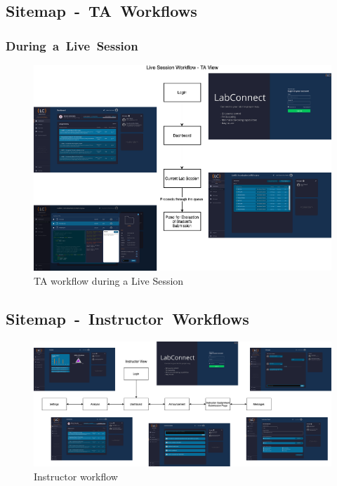 \documentclass[a4paper, 12pt]{article}
\begin{document}
    \pagebreak

    \subsection{Sitemap~-~TA~Workflows}

    \subsubsection{During~a~Live~Session}

    \begin{figure}[H]
      \centering
      \includegraphics[width=\textwidth]{map_live-session-ta}
      \caption{TA workflow during a Live Session}\label{fig:map_live_ta}
    \end{figure}

    \pagebreak

    \subsection{Sitemap~-~Instructor~Workflows}

    \begin{figure}[H]
      \centering
      \includegraphics[width=\textwidth]{map_instructor}
      \caption{Instructor workflow}\label{fig:map_instructor}
    \end{figure}
\end{document}
